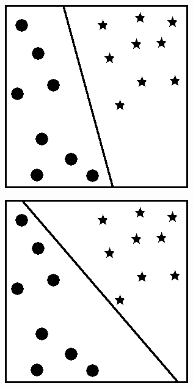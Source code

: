 \begin{figure}[h!]
    \begin{subfigure}[b]{0.33\textwidth}
        \includegraphics[width=\linewidth]{img/granica_1.jpg}
    \end{subfigure}%
    \begin{subfigure}[b]{0.33\textwidth}
        \includegraphics[width=\linewidth]{img/granica_2.jpg}

\end{subfigure}
\end{figure}
